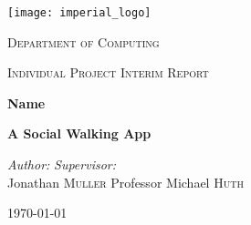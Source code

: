 \begin{titlepage}
    \begin{center}
        \vspace*{2cm}
        \texttt{[image: imperial\_logo]}
        \vspace{2cm}
        
        \LARGE
        \textsc{Department of Computing}
        
        \textsc{Individual Project Interim Report}
        
        \vspace{2cm}
        \vhrulefill{2pt}
        \vspace{0.2cm}
        
        \huge
        \textbf{Name}
        
        \vspace{0.2cm}
        
        \LARGE
        \textbf{A Social Walking App}
        
        \vspace{0.2cm}
        \vhrulefill{2pt}
        \vspace{2cm}
        
        \begin{flushleft}
            \Large
            \textit{Author:}
            \hfill
            \textit{Supervisor:}\\
            Jonathan \textsc{Muller}
            \hfill
            Professor Michael \textsc{Huth}\\
        \end{flushleft}
        
        \vfill
        \Large
        \today
    \end{center}
\end{titlepage}